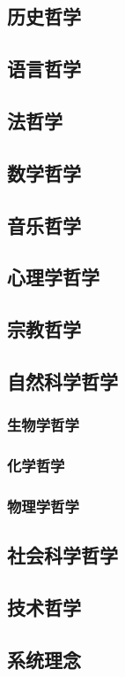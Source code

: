 \documentclass[UTF8]{../RepresentationUniverse}
\begin{document}
    \subsection{历史哲学}
    \subsection{语言哲学}
    \subsection{法哲学}
    \subsection{数学哲学}
    \subsection{音乐哲学}
    \subsection{心理学哲学}
    \subsection{宗教哲学}
    \subsection{自然科学哲学}
    \subsubsection{生物学哲学}
    \subsubsection{化学哲学}
    \subsubsection{物理学哲学}
    \subsection{社会科学哲学}
    \subsection{技术哲学}
    \subsection{系统理念}
\end{document}
